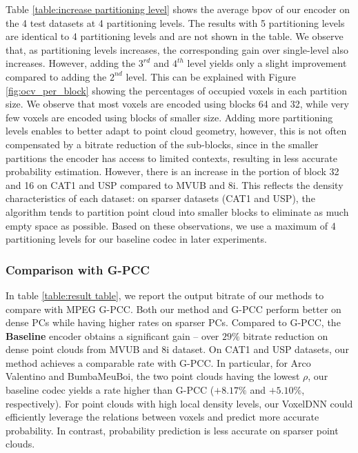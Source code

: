 Table \ref{table:increase partitioning level} shows the average bpov of our encoder on the 4 test datasets at 4 partitioning levels. The results with 5 partitioning levels are identical to 4 partitioning levels and are not shown in the table. We observe that, as partitioning levels increases, the corresponding gain over single-level also increases. However, adding the $3^{rd}$ and $4^{th}$ level yields only a slight improvement compared to adding the $2^{nd}$ level. This can be explained with Figure \ref{fig:ocv_per_block} showing the percentages of occupied voxels in each partition size. We  observe that most  voxels are encoded using blocks 64 and 32, while very few voxels are encoded using blocks of smaller size. Adding more partitioning levels enables to better adapt to point cloud geometry, however, this is not often compensated by a bitrate reduction of the sub-blocks, since in the smaller partitions the encoder has access to limited contexts, resulting in less accurate probability estimation. However, there is an increase in the portion of block 32 and 16 on CAT1 and USP compared to MVUB and 8i. This reflects the density characteristics of each dataset: on sparser datasets (CAT1 and USP), the algorithm tends to partition point cloud into smaller blocks to eliminate as much empty space as possible. Based on these observations, we use a maximum of 4 partitioning levels for our baseline codec in later experiments.
%




\subsubsection{Comparison with G-PCC} 
In table \ref{table:result table}, we report the output bitrate of our methods to compare with MPEG G-PCC. Both our method and G-PCC perform better on dense PCs while having higher rates on sparser PCs. 
Compared to G-PCC, the \textbf{Baseline} encoder obtains a significant gain -- over $29\%$ bitrate reduction on dense point clouds from MVUB and 8i dataset. On CAT1 and USP datasets, our method achieves a comparable rate with G-PCC. In particular, for Arco Valentino and BumbaMeuBoi, the two point clouds having the lowest $\rho$, our baseline codec yields a rate higher than G-PCC ($+8.17\%$ and $+5.10\%$, respectively). For point clouds with high local density levels, our VoxelDNN could efficiently leverage the relations between voxels and predict more accurate probability. In contrast, probability prediction is less accurate on sparser point clouds. 

